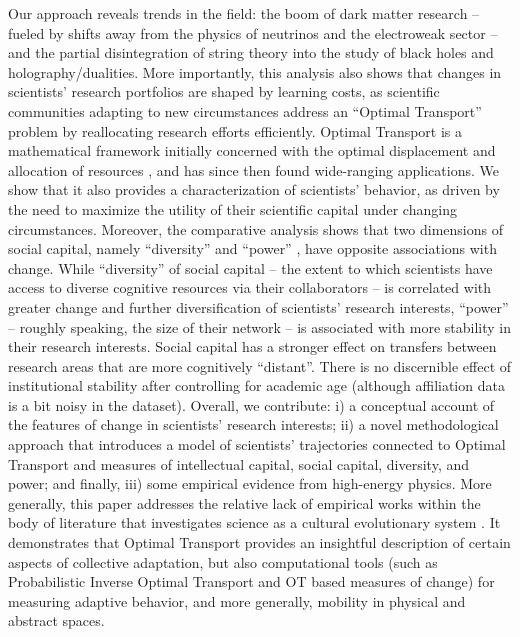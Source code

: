 \documentclass{article}
\begin{document}
Our approach reveals trends in the field: the boom of dark matter research -- fueled by shifts away from the physics of neutrinos and the electroweak sector -- and the partial disintegration of string theory into the study of black holes and holography/dualities. More importantly, this analysis also shows that changes in scientists' research portfolios are shaped by learning costs, as scientific communities adapting to new circumstances address an ``Optimal Transport'' problem by reallocating research efforts efficiently. Optimal Transport is a mathematical framework initially concerned with the optimal displacement and allocation of resources \citep{monge1781memoire,kantorovich2006translocation,Peyr2019}, and has since then found wide-ranging applications. We show that it also provides a characterization of scientists' behavior, as driven by the need to maximize the utility of their scientific capital under changing circumstances. Moreover, the comparative analysis shows that two dimensions of social capital, namely ``diversity'' and ``power'' \citep{Abbasi2014}, have opposite associations with change. While ``diversity'' of social capital  -- the extent to which scientists have access to diverse cognitive resources via their collaborators -- is correlated with greater change and further diversification of scientists' research interests, ``power'' -- roughly speaking, the size of their network -- is associated with more stability in their research interests. Social capital has a stronger effect on transfers between research areas that are more cognitively ``distant''. There is no discernible effect of institutional stability after controlling for academic age (although affiliation data is a bit noisy in the dataset). Overall, we contribute: i) a conceptual account of the features of change in scientists' research interests; ii) a novel methodological approach that introduces a model of scientists' trajectories connected to Optimal Transport and measures of intellectual capital, social capital, diversity, and power; and finally, iii) some empirical evidence from high-energy physics. More generally, this paper addresses the relative lack of empirical works within the body of literature that investigates science as a cultural evolutionary system \citep{Wu2023}. It demonstrates that Optimal Transport provides an insightful description of certain aspects of collective adaptation, but also computational tools (such as Probabilistic Inverse Optimal Transport \citep{pmlr-v162-chiu22b} and OT based measures of change) for measuring adaptive behavior, and more generally, mobility in physical and abstract spaces.
\end{document}
